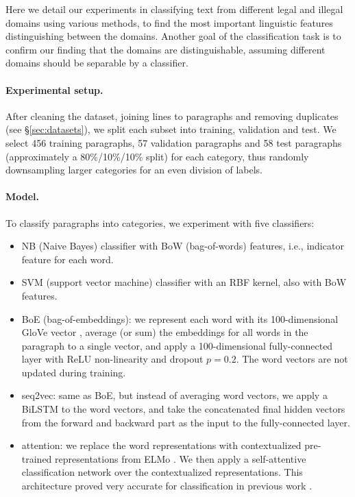 \documentclass[11pt,a4paper,table]{article}
\begin{document}
Here we detail our experiments in classifying text from different legal and
illegal domains using various methods, to find the most important linguistic features
distinguishing between the domains. Another goal of the classification task is to confirm our finding that the domains are distinguishable, assuming different domains should be separable by a classifier.

\paragraph{Experimental setup.}

After cleaning the dataset, joining lines to paragraphs and removing duplicates
(see \S\ref{sec:datasets}), we split each subset into training, validation and test.
We select 456 training paragraphs, 57 validation paragraphs and
58 test paragraphs (approximately a 80\%/10\%/10\% split) for each category,
thus randomly downsampling larger categories for an even division of labels.

\paragraph{Model.}

To classify paragraphs into categories, we experiment with five classifiers:

\begin{itemize}
  \item NB (Naive Bayes) classifier
  with BoW (bag-of-words) features, i.e., indicator feature for each word.
  \item SVM (support vector machine) classifier with an RBF kernel,
  also with BoW features.
  \item BoE (bag-of-embeddings): we represent each word with its 100-dimensional
  GloVe vector \cite{pennington2014glove}, average (or sum) the embeddings for all words in the paragraph
  to a single vector, and apply a 100-dimensional fully-connected layer with
  ReLU non-linearity and dropout $p=0.2$.
  The word vectors are not updated during training.
  \item seq2vec: same as BoE, but instead of averaging word vectors,
  we apply a BiLSTM to the word vectors, and take the concatenated
  final hidden vectors from the forward and backward part as the input to the
  fully-connected layer.
  \item attention: we replace the word representations with contextualized
  pre-trained representations from ELMo \cite{Peters:2018}. We then apply a self-attentive
  classification network \cite{mccann2017learned} over the contextualized representations. This architecture proved very accurate for classification in
  previous work \cite{W18-5427,D18-1401}.
\end{itemize}
\end{document}
